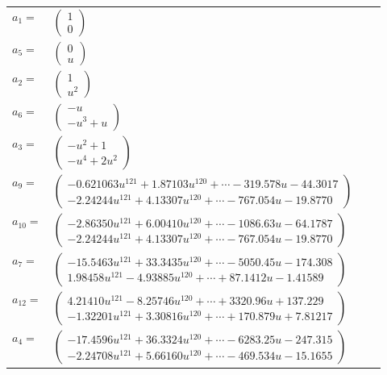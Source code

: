 \documentclass[1p]{elsarticle_modified}
\theoremstyle{definition}
\begin{document}
\begin{tabular}{m{7pt} m{180pt} m{7pt} m{180pt} }
\flushright $a_{1}=$&$\begin{pmatrix}1\\0\end{pmatrix}$ \\
\flushright $a_{5}=$&$\begin{pmatrix}0\\u\end{pmatrix}$ \\
\flushright $a_{2}=$&$\begin{pmatrix}1\\u^2\end{pmatrix}$ \\
\flushright $a_{6}=$&$\begin{pmatrix}- u\\- u^3+u\end{pmatrix}$ \\
\flushright $a_{3}=$&$\begin{pmatrix}- u^2+1\\- u^4+2 u^2\end{pmatrix}$ \\
\flushright $a_{9}=$&$\begin{pmatrix}-0.621063 u^{121}+1.87103 u^{120}+\cdots-319.578 u-44.3017\\-2.24244 u^{121}+4.13307 u^{120}+\cdots-767.054 u-19.8770\end{pmatrix}$ \\
\flushright $a_{10}=$&$\begin{pmatrix}-2.86350 u^{121}+6.00410 u^{120}+\cdots-1086.63 u-64.1787\\-2.24244 u^{121}+4.13307 u^{120}+\cdots-767.054 u-19.8770\end{pmatrix}$ \\
\flushright $a_{7}=$&$\begin{pmatrix}-15.5463 u^{121}+33.3435 u^{120}+\cdots-5050.45 u-174.308\\1.98458 u^{121}-4.93885 u^{120}+\cdots+87.1412 u-1.41589\end{pmatrix}$ \\
\flushright $a_{12}=$&$\begin{pmatrix}4.21410 u^{121}-8.25746 u^{120}+\cdots+3320.96 u+137.229\\-1.32201 u^{121}+3.30816 u^{120}+\cdots+170.879 u+7.81217\end{pmatrix}$ \\
\flushright $a_{4}=$&$\begin{pmatrix}-17.4596 u^{121}+36.3324 u^{120}+\cdots-6283.25 u-247.315\\-2.24708 u^{121}+5.66160 u^{120}+\cdots-469.534 u-15.1655\end{pmatrix}$ \\

\end{tabular}
\end{document}
